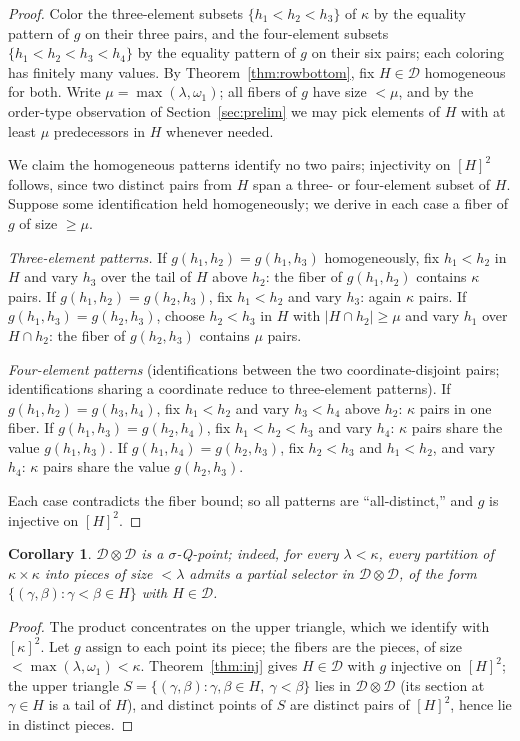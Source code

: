 \documentclass[11pt]{article}
\newtheorem{corollary}[theorem]{Corollary}
\theoremstyle{definition}
\newcommand{\D}{\mathcal{D}}
\begin{document}
\begin{proof}
Color the three-element subsets $\{h_1<h_2<h_3\}$ of $\kappa$ by the
equality pattern of $g$ on their three pairs, and the four-element subsets
$\{h_1<h_2<h_3<h_4\}$ by the equality pattern of $g$ on their six pairs;
each coloring has finitely many values. By
Theorem~\ref{thm:rowbottom}, fix $H\in\D$ homogeneous for both. Write
$\mu=\max(\lambda,\omega_1)$; all fibers of $g$ have size $<\mu$, and by
the order-type observation of Section~\ref{sec:prelim} we may pick elements
of $H$ with at least $\mu$ predecessors in $H$ whenever needed.

We claim the homogeneous patterns identify no two pairs; injectivity on
$[H]^2$ follows, since two distinct pairs from $H$ span a three- or
four-element subset of $H$. Suppose some identification held
homogeneously; we derive in each case a fiber of $g$ of size $\ge\mu$.

\emph{Three-element patterns.} If $g(h_1,h_2)=g(h_1,h_3)$ homogeneously,
fix $h_1<h_2$ in $H$ and vary $h_3$ over the tail of $H$ above $h_2$: the
fiber of $g(h_1,h_2)$ contains $\kappa$ pairs. If
$g(h_1,h_2)=g(h_2,h_3)$, fix $h_1<h_2$ and vary $h_3$: again $\kappa$
pairs. If $g(h_1,h_3)=g(h_2,h_3)$, choose $h_2<h_3$ in $H$ with
$|H\cap h_2|\ge\mu$ and vary $h_1$ over $H\cap h_2$: the fiber of
$g(h_2,h_3)$ contains $\mu$ pairs.

\emph{Four-element patterns} (identifications between the two
coordinate-disjoint pairs; identifications sharing a coordinate reduce to
three-element patterns). If $g(h_1,h_2)=g(h_3,h_4)$, fix $h_1<h_2$ and
vary $h_3<h_4$ above $h_2$: $\kappa$ pairs in one fiber. If
$g(h_1,h_3)=g(h_2,h_4)$, fix $h_1<h_2<h_3$ and vary $h_4$: $\kappa$ pairs
share the value $g(h_1,h_3)$. If $g(h_1,h_4)=g(h_2,h_3)$, fix
$h_2<h_3$ and $h_1<h_2$, and vary $h_4$: $\kappa$ pairs share the value
$g(h_2,h_3)$.

Each case contradicts the fiber bound; so all patterns are
``all-distinct,'' and $g$ is injective on $[H]^2$.
\end{proof}

\begin{corollary}\label{cor:product-sigmaQ}
$\D\otimes\D$ is a $\sigma$-Q-point; indeed, for every $\lambda<\kappa$,
every partition of $\kappa\times\kappa$ into pieces of size $<\lambda$
admits a partial selector in $\D\otimes\D$, of the form
$\{(\gamma,\beta):\gamma<\beta\in H\}$ with $H\in\D$.
\end{corollary}

\begin{proof}
The product concentrates on the upper triangle, which we identify with
$[\kappa]^2$. Let $g$ assign to each point its piece; the fibers are the
pieces, of size $<\max(\lambda,\omega_1)<\kappa$. Theorem~\ref{thm:inj}
gives $H\in\D$ with $g$ injective on $[H]^2$; the upper triangle
$S=\{(\gamma,\beta):\gamma,\beta\in H,\ \gamma<\beta\}$ lies in
$\D\otimes\D$ (its section at $\gamma\in H$ is a tail of $H$), and
distinct points of $S$ are distinct pairs of $[H]^2$, hence lie in
distinct pieces.
\end{proof}
\end{document}

